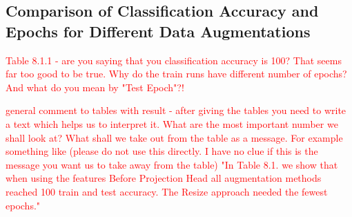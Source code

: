 \subsection{Comparison of Classification Accuracy and Epochs for Different Data Augmentations}

\textcolor{red}{Table 8.1.1 - are you saying that you classification accuracy is 100?
 That seems far too good to be true. Why do the train runs have different number of epochs? And what do you mean by "Test Epoch"?!}


 \textcolor{red}{general comment to tables with result - after giving the tables you need to write a text which helps us to interpret it. What are the most important 
 number we shall look at? What shall we take out from the table as a message. For example something like (please do not use this directly. I have no clue 
 if this is the message you want us to take away from the table) "In Table 8.1. we show that when using the features Before Projection Head all 
 augmentation methods reached 100 train and test accuracy. The Resize approach needed the fewest epochs."}
    
    \begin{table}[h!]
        \centering
        \caption{Performance metrics for different augmentation strategies before and after the projection head.}
        \label{tab:augmentation_metric}
        \end{table}
        

